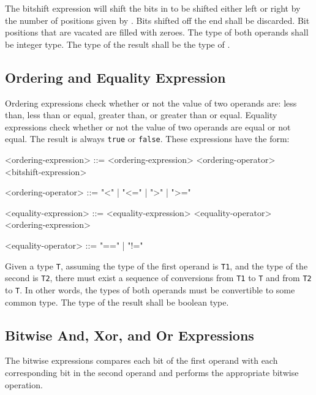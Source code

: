 The bitshift expression will shift the bits in  to be shifted either left or right by the number of positions given by . Bits shifted off the end shall be discarded. Bit positions that are vacated are filled with zeroes. The type of both operands shall be integer type. The type of the result shall be the type of .

\subsection{Ordering and Equality Expression} \label{guide:ordering_expr}

Ordering expressions check whether or not the value of two operands are: less than, less than or equal, greater than, or greater than or equal. Equality expressions check whether or not the value of two operands are equal or not equal. The result is always \texttt{true} or \texttt{false}. These expressions have the form: 

\begin{minip}
\begin{grammar}
<ordering-expression> ::= <ordering-expression> 
<ordering-operator> <bitshift-expression>

<ordering-operator> ::= "<" | "<=" | ">" | ">="

<equality-expression> ::= <equality-expression>
<equality-operator> <ordering-expression>

<equality-operator> ::= "==" | "!="
\end{grammar}
\end{minip}

Given a type \texttt{T}, assuming the type of the first operand is \texttt{T1}, and the type of the second is \texttt{T2}, there must exist a sequence of conversions from \texttt{T1} to \texttt{T} and from \texttt{T2} to \texttt{T}. In other words, the types of both operands must be convertible to some common type. The type of the result shall be boolean type.

\subsection{Bitwise And, Xor, and Or Expressions} \label{guide:bitwise_expr}

The bitwise expressions compares each bit of the first operand with each corresponding bit in the second operand and performs the appropriate bitwise operation.

